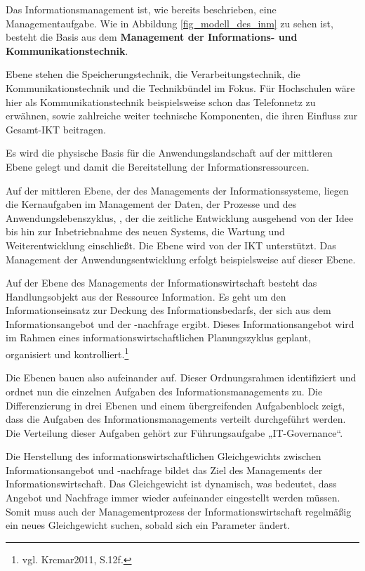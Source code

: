 Das Informationsmanagement ist, wie bereits beschrieben, eine Managementaufgabe. Wie in Abbildung \ref{fig_modell_des_inm} zu sehen ist, besteht die Basis aus dem \textbf{Management der Informations- und Kommunikationstechnik}.

Ebene stehen die Speicherungstechnik, die Verarbeitungstechnik, die Kommunikationstechnik und die Technikbündel im Fokus. Für Hochschulen wäre hier als Kommunikationstechnik beispielsweise schon das Telefonnetz zu erwähnen, sowie zahlreiche weiter technische Komponenten, die ihren Einfluss zur Gesamt-IKT beitragen.

Es wird die physische Basis für die Anwendungslandschaft auf der mittleren Ebene gelegt und damit die Bereitstellung der Informationsressourcen.

Auf der mittleren Ebene, der des Managements der Informationssysteme, liegen die Kernaufgaben im Management der Daten, der Prozesse und des Anwendungslebenszyklus, , der die zeitliche Entwicklung ausgehend von der Idee bis hin zur Inbetriebnahme des neuen Systems, die Wartung und Weiterentwicklung einschließt. Die Ebene wird von der IKT unterstützt. Das Management der Anwendungsentwicklung erfolgt beispielsweise auf dieser Ebene.

Auf der Ebene des Managements der Informationswirtschaft besteht das Handlungsobjekt aus der Ressource Information. Es geht um den Informationseinsatz zur Deckung des Informationsbedarfs, der sich aus dem Informationsangebot und der -nachfrage ergibt. Dieses Informationsangebot wird im Rahmen eines informationswirtschaftlichen Planungszyklus geplant, organisiert und kontrolliert.\footnote{vgl. Krcmar2011, S.12f.}

Die Ebenen bauen also aufeinander auf. Dieser Ordnungsrahmen identifiziert und ordnet nun die einzelnen Aufgaben des Informationsmanagements zu. 
Die Differenzierung in drei Ebenen und einem übergreifenden Aufgabenblock zeigt, dass die Aufgaben des Informationsmanagements verteilt durchgeführt werden. Die Verteilung dieser Aufgaben gehört zur Führungsaufgabe „IT-Governance“.

Die Herstellung des informationswirtschaftlichen Gleichgewichts zwischen Informationsangebot und -nachfrage bildet das Ziel des Managements der Informationswirtschaft. 
Das Gleichgewicht ist dynamisch, was bedeutet, dass Angebot und Nachfrage immer wieder aufeinander eingestellt werden müssen. Somit muss auch der Managementprozess der Informationswirtschaft regelmäßig ein neues Gleichgewicht suchen, sobald sich ein Parameter ändert.

